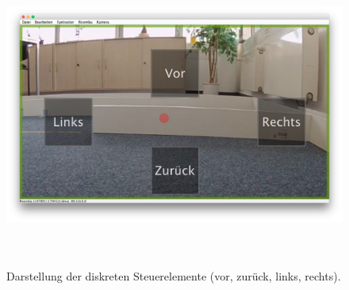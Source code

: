\begin{figure}[ht]
\begin{center}
\includegraphics[width=\textwidth, height=100mm]{bilder/implementierung/diskretMode.JPG}
\end{center}
\caption{Darstellung der diskreten Steuerelemente (vor, zurück, links, rechts).}
\label{fig:diskretMode}
\end{figure}

